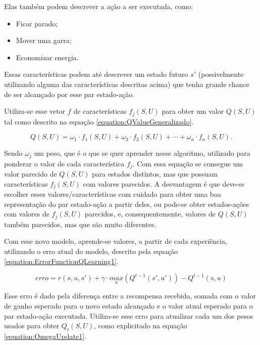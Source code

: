 Elas também podem descrever a ação a ser executada, como:

\begin{itemize}
	\item Ficar parado;
	\item Mover uma garra;
	\item Economizar energia.
\end{itemize}

Essas características podem até descrever um estado futuro $ s' $ (possivelmente utilizando alguma das características descritas acima) que tenha grande chance de ser alcançado por esse par estado-ação.

Utiliza-se esse vetor $ f $ de características $ f_j \left( S, U \right) $ para obter um valor $ Q \left( S, U \right) $ tal como descrito na equação \ref{equation:QValueGeneralizado}.

\begin{equation} \label{equation:QValueGeneralizado}
	Q \left( S, U \right) = \omega_1 \cdot f_1 \left( S, U \right) + \omega_2 \cdot f_2 \left( S, U \right) + \cdots + \omega_n \cdot f_n \left( S, U \right).
\end{equation}

Sendo $ \omega_j $ um peso, que é o que se quer aprender nesse algoritmo, utilizado para ponderar o valor de cada característica $ f_j $. Com essa equação se consegue um valor parecido de $ Q \left( S, U \right) $ para estados distintos, mas que possuam características $ f_j \left( S, U \right) $ com valores parecidos. A desvantagem é que deve-se escolher esses valores/características com cuidado para obter uma boa representação do par estado-ação a partir deles, ou pode-se obter estados-ações com valores de $ f_j \left( S, U \right)$ parecidos, e, consequentemente, valores de $ Q \left( S, U \right) $ também parecidos, mas que são muito diferentes.

Com esse novo modelo, aprende-se valores, a partir de cada experiência, utilizando o erro atual do modelo, descrito pela equação \ref{equation:ErrorFunctionQLearning1}.

\begin{equation} \label{equation:ErrorFunctionQLearning1}
	erro = r \left( s, u, s' \right) + \gamma \cdot \underset{u}{max} \left( Q^{t-1} \left( s', u' \right) \right) - Q^{t-1} \left( s, u \right)
\end{equation}

Esse erro é dado pela diferença entre a recompensa recebida, somada com o valor de ganho esperado para o novo estado alcançado e o valor atual esperado para o par estado-ação executada. Utiliza-se esse erro para atualizar cada um dos pesos usados para obter $ Q_t \left( S, U \right) $, como explicitado na equação \ref{equation:OmegaUpdate1}.

